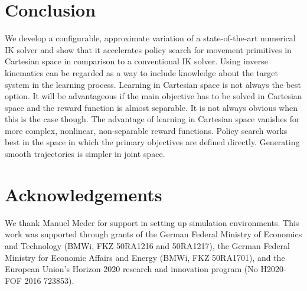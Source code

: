 \documentclass{svproc}
\begin{document}
\section{Conclusion}
We develop a configurable, approximate variation of a state-of-the-art
numerical IK solver and show that it accelerates policy
search for movement primitives in Cartesian space in comparison to a
conventional IK solver. Using inverse kinematics can be
regarded as a way to include knowledge about the target system in the
learning process.
Learning in Cartesian space is not always the best option.
It will be advantageous if the main objective has to be solved in
Cartesian space and the reward function is almost separable.
It is not always obvious when this is the case though.
The advantage of learning in Cartesian space vanishes for
more complex, nonlinear, non-separable reward functions.
Policy search works best in the space in which the primary
objectives are defined directly.
Generating smooth trajectories is simpler in joint space.

\section*{Acknowledgements}
{\small
We thank Manuel Meder for support in setting up simulation environments.
This work was supported through grants of the German Federal Ministry of
Economics and Technology (BMWi, FKZ 50RA1216 and 50RA1217),
the German Federal Ministry for Economic Affairs and Energy
(BMWi, FKZ 50RA1701),
and the European Union's Horizon 2020 research and innovation program
(No H2020-FOF 2016 723853).
}



\end{document}
